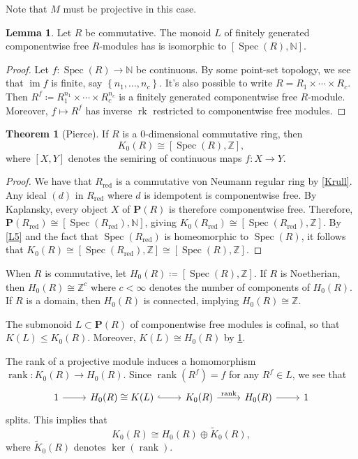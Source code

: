 \documentclass[10pt,letterpaper,cm]{nupset}
\theoremstyle{definition}
\theoremstyle{theorem}
\newtheorem{theorem}[definition]{Theorem}
\newtheorem{lemma}[definition]{Lemma}
\theoremstyle{remark}
\newcommand{\N}{\mathbb N}
\renewcommand{\P}{\mathbf P}
\newcommand{\Z}{\mathbb Z}
\newcommand{\1}{\mathbf{1}}
\newcommand{\0}{\vec 0}
\DeclareMathOperator{\im}{im}
\DeclareMathOperator{\red}{red}
\DeclareMathOperator{\spec}{Spec}
\DeclareMathOperator{\rank}{rank}
\DeclareMathOperator{\rk}{rk}
\begin{document}
Note that $M$ must be projective in this case.

\begin{lemma}\label{L6}
Let $R$ be commutative. The monoid $L$ of finitely generated componentwise free $R$-modules has is isomorphic to $\left[\spec(R), \N\right]$.
\end{lemma}
\begin{proof}
Let $f: \spec(R) \to \N$ be continuous. By some point-set topology, we see that $\im f$ is finite, say $\left\{n_1, \ldots, n_c\right\}$. It's also possible to write $R= R_1 \times \cdots \times R_c$. Then $R^f \coloneqq R_1^{n_1} \times \cdots \times R_c^{n_c}$ is a finitely generated componentwise free $R$-module. Moreover, $f \mapsto R^f$ has inverse $\rk$ restricted to componentwise free modules.
\end{proof}


\begin{theorem}[Pierce]
If $R$ is a $0$-dimensional commutative ring, then $$K_0(R) \cong \left[\spec(R), \Z\right],$$ where $[X, Y]$ denotes the semiring of continuous maps $f: X\to Y$.
\end{theorem}
\begin{proof}
We have that $R_{\red}$ is a commutative von Neumann regular ring by \cref{Krull}. Any ideal $(d)$ in $R_{\red}$  where $d$ is idempotent is componentwise free. By Kaplansky, every object $X$ of $\P(R)$ is therefore componentwise free. Therefore, $\P(R_{\red}) \cong \left[\spec(R_{\red}), \N\right]$, giving $K_0(R_{\red}) \cong [\spec(R_{\red}), \Z]$. By \cref{L5} and the fact that $\spec(R_{\red})$ is homeomorphic to $\spec(R)$, it follows that $K_0(R)\cong \left[\spec(R_{\red}), \Z\right] \cong \left[\spec(R), \Z\right]$.
\end{proof}

\smallskip

When $R$ is commutative, let $H_0(R) \coloneqq [\spec(R), \Z]$. If $R$ is Noetherian, then $H_0(R) \cong \Z^c$ where $c <\infty$ denotes the number of components of $H_0(R)$. If $R$ is a domain, then $H_0(R)$ is connected, implying $H_0(R) \cong \Z$.

The submonoid $L\subset \P(R)$ of componentwise free modules is cofinal, so that $K(L) \leq K_0(R)$. Moreover, $K(L) \cong H_0(R)$ by \cref{L6}.

The rank of a projective module induces a homomorphism $\rank: K_0(R) \to H_0(R)$. Since $\rank(R^f) = f$ for any $R^f \in L$, we see that
\[
\begin{tikzcd}
1 \arrow[r] & H_0(R) \cong K(L) \arrow[r, hook] & K_0(R) \arrow[r, "\rank"] & H_0(R) \arrow[r] & 1
\end{tikzcd}
\]
splits. This implies that $$K_0(R) \cong H_0(R) \oplus \widetilde{K}_0(R),$$ where $\widetilde{K}_0(R)$ denotes $\ker(\rank)$.
\end{document}
